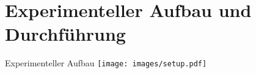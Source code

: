 \section{Experimenteller Aufbau und Durchführung}


\begin{frame}{Experimenteller Aufbau}
    \pause
    \centering
    \texttt{[image: images/setup.pdf]}\\[-0.5\baselineskip]
\end{frame}


